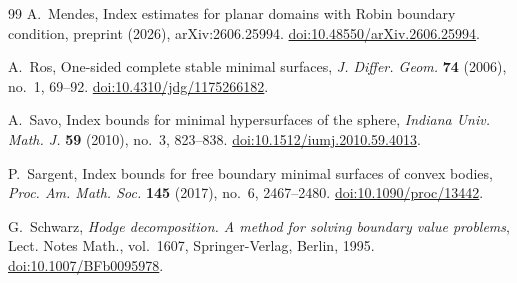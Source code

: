 \documentclass[11pt]{amsart}
\numberwithin{equation}{section}
\theoremstyle{definition}
\theoremstyle{remark}
\begin{document}
\begin{thebibliography}{99}
A.~Mendes,
Index estimates for planar domains with Robin boundary condition,
preprint (2026), arXiv:2606.25994.
\href{https://doi.org/10.48550/arXiv.2606.25994}
{doi:10.48550/arXiv.2606.25994}.

A.~Ros,
One-sided complete stable minimal surfaces,
\emph{J. Differ. Geom.} \textbf{74} (2006),
no.~1, 69--92.
\href{https://doi.org/10.4310/jdg/1175266182}
{doi:10.4310/jdg/1175266182}.

A.~Savo,
Index bounds for minimal hypersurfaces of the sphere,
\emph{Indiana Univ. Math. J.} \textbf{59} (2010), no.~3, 823--838.
\href{https://doi.org/10.1512/iumj.2010.59.4013}
{doi:10.1512/iumj.2010.59.4013}.

P.~Sargent,
Index bounds for free boundary minimal surfaces of convex bodies,
\emph{Proc. Am. Math. Soc.} \textbf{145} (2017),
no.~6, 2467--2480.
\href{https://doi.org/10.1090/proc/13442}
{doi:10.1090/proc/13442}.

G.~Schwarz,
\emph{Hodge decomposition. A method for solving boundary
value problems},
Lect. Notes Math., vol.~1607,
Springer-Verlag, Berlin, 1995.
\href{https://doi.org/10.1007/BFb0095978}
{doi:10.1007/BFb0095978}.

\end{thebibliography}
\end{document}
